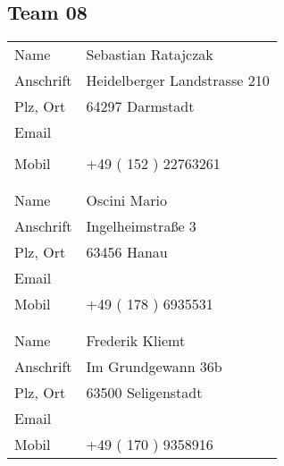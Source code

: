 \subsection{Team 08
}\label{subsec:student}

\begin{tabularx}{0.95\textwidth}{l X}
    Name            & Sebastian Ratajczak
    \\
    Anschrift       & Heidelberger Landstrasse 210
    \\
    Plz, Ort        & 64297 Darmstadt
    \\
    Email   & \sitHref[sebastian.ratajczak@stud.h-da.de]{%
              mailto:sebastian.ratajczak@stud.h-da.de}
    \\ %
            & \sitHref[s.ratajczak@iot-venture.com]{%
              mailto:s.ratajczak@iot-venture.com}
    \\
    Mobil   & +49 ( 152 ) 22763261
    \\ \\ \hline \\
    Name            & Oscini Mario
    \\
    Anschrift       & Ingelheimstraße 3
    \\
    Plz, Ort        & 63456 Hanau
    \\
    Email   & \sitHref[mario.oscini@stud.h-da.de]{%
              mailto:mario.oscini@stud.h-da.de}
    \\
    Mobil   & +49 ( 178 ) 6935531
    \\ \\ \hline \\
    Name            & Frederik Kliemt
    \\
    Anschrift       & Im Grundgewann 36b
    \\
    Plz, Ort        & 63500 Seligenstadt
    \\
    Email   & \sitHref[Frederik.Kliemt@stud.h-da.de]{%
              mailto:Frederik.Kliemt@stud.h-da.de}
    \\
    Mobil   & +49 ( 170 ) 9358916
\end{tabularx}

